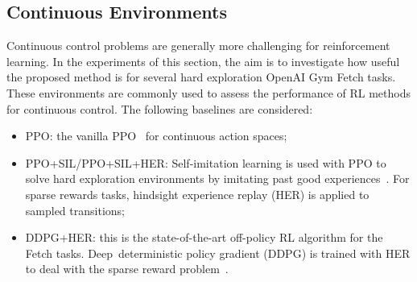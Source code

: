 \subsection{Continuous Environments}
{Continuous control problems are generally more challenging for reinforcement learning. In the experiments of this section, the aim is to investigate how useful the proposed method is for several hard exploration OpenAI Gym Fetch tasks. These environments are commonly used to assess the performance of RL methods for continuous control.} The following baselines are considered: 
\begin{itemize}
    \item PPO: the vanilla PPO~\cite{schulman2017proximal} for continuous action spaces;
    \item PPO+SIL/PPO+SIL+HER: Self-imitation learning is used with PPO to solve hard exploration environments by imitating past good experiences~\cite{oh2018self}. For sparse rewards tasks, hindsight experience replay (HER) is applied to sampled transitions;
    \item DDPG+HER: this is the state-of-the-art off-policy RL algorithm for the Fetch tasks. Deep~deterministic policy gradient (DDPG) is trained with HER to deal with the sparse reward problem~\cite{andrychowicz2017hindsight}.
\end{itemize}
